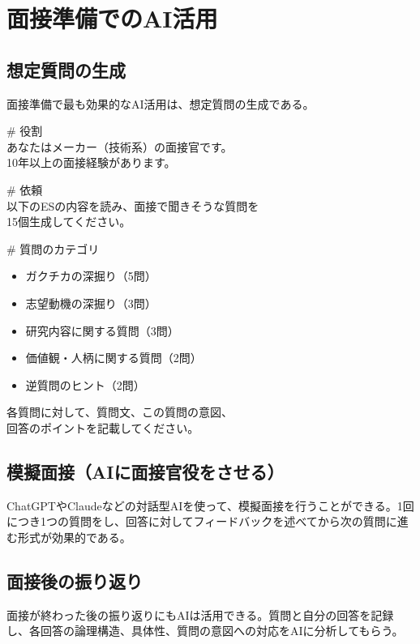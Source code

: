 \section{面接準備でのAI活用}

\subsection*{想定質問の生成}

面接準備で最も効果的なAI活用は、想定質問の生成である。

\begin{promptbox}
\# 役割\\
あなたはメーカー（技術系）の面接官です。\\
10年以上の面接経験があります。

\# 依頼\\
以下のESの内容を読み、面接で聞きそうな質問を\\
15個生成してください。

\# 質問のカテゴリ
\begin{itemize}
\item ガクチカの深掘り（5問）
\item 志望動機の深掘り（3問）
\item 研究内容に関する質問（3問）
\item 価値観・人柄に関する質問（2問）
\item 逆質問のヒント（2問）
\end{itemize}

各質問に対して、質問文、この質問の意図、\\
回答のポイントを記載してください。
\end{promptbox}

\subsection*{模擬面接（AIに面接官役をさせる）}

ChatGPTやClaudeなどの対話型AIを使って、模擬面接を行うことができる。1回につき1つの質問をし、回答に対してフィードバックを述べてから次の質問に進む形式が効果的である。

\subsection*{面接後の振り返り}

面接が終わった後の振り返りにもAIは活用できる。質問と自分の回答を記録し、各回答の論理構造、具体性、質問の意図への対応をAIに分析してもらう。

